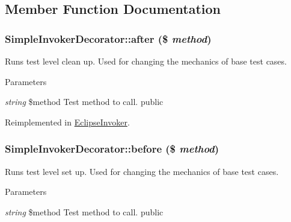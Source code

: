 \subsection{Member Function Documentation}
\hypertarget{class_simple_invoker_decorator_a7b4b69f4e499f4e15c52e57542c52d7e}{
\subsubsection[{after}]{\setlength{\rightskip}{0pt plus 5cm}SimpleInvokerDecorator::after (\$ {\em method})}}
\label{class_simple_invoker_decorator_a7b4b69f4e499f4e15c52e57542c52d7e}
Runs test level clean up. Used for changing the mechanics of base test cases. 
\begin{DoxyParams}{Parameters}
\item[{\em string}]\$method Test method to call.  public \end{DoxyParams}


Reimplemented in \hyperlink{class_eclipse_invoker_a7d9cfe918be1c61e93dfd8eb31ef5b46}{EclipseInvoker}.\hypertarget{class_simple_invoker_decorator_affaed9e6d8d366064589bbcdae7a6f15}{
\subsubsection[{before}]{\setlength{\rightskip}{0pt plus 5cm}SimpleInvokerDecorator::before (\$ {\em method})}}
\label{class_simple_invoker_decorator_affaed9e6d8d366064589bbcdae7a6f15}
Runs test level set up. Used for changing the mechanics of base test cases. 
\begin{DoxyParams}{Parameters}
\item[{\em string}]\$method Test method to call.  public \end{DoxyParams}


